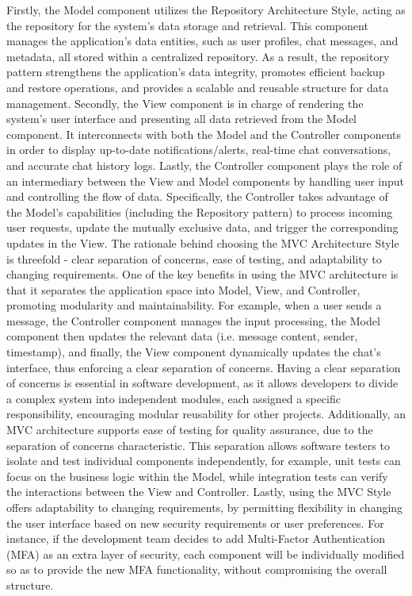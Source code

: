 \documentclass[]{article}
\begin{document}
Firstly, the Model component utilizes the Repository Architecture Style, acting as the repository for the system’s data storage and retrieval. This component manages the application's data entities, such as user profiles, chat messages, and metadata, all stored within a centralized repository. As a result, the repository pattern strengthens the application's data integrity, promotes efficient backup and restore operations, and provides a scalable and reusable structure for data management. Secondly, the View component is in charge of rendering the system’s user interface and presenting all data retrieved from the Model component. It interconnects with both the Model and the Controller components in order to display up-to-date notifications/alerts, real-time chat conversations, and accurate chat history logs. Lastly, the Controller component plays the role of an intermediary between the View and Model components by handling user input and controlling the flow of data. Specifically, the Controller takes advantage of the Model’s capabilities (including the Repository pattern) to process incoming user requests, update the mutually exclusive data, and trigger the corresponding updates in the View.
\newline\newline
The rationale behind choosing the MVC Architecture Style is threefold - clear separation of concerns, ease of testing, and adaptability to changing requirements. One of the key benefits in using the MVC architecture is that it separates the application space into Model, View, and Controller, promoting modularity and maintainability. For example, when a user sends a message, the Controller component manages the input processing, the Model component then updates the relevant data (i.e. message content, sender, timestamp), and finally, the View component dynamically updates the chat’s interface, thus enforcing a clear separation of concerns. Having a clear separation of concerns is essential in software development, as it allows developers to divide a complex system into independent modules, each assigned a specific responsibility, encouraging modular reusability for other projects. Additionally, an MVC architecture supports ease of testing for quality assurance, due to the separation of concerns characteristic. This separation allows software testers to isolate and test individual components independently, for example, unit tests can focus on the business logic within the Model, while integration tests can verify the interactions between the View and Controller. Lastly, using the MVC Style offers adaptability to changing requirements, by permitting flexibility in changing the user interface based on new security requirements or user preferences. For instance, if the development team decides to add Multi-Factor Authentication (MFA) as an extra layer of security, each component will be individually modified so as to provide the new MFA functionality, without compromising the overall structure.
\end{document}
